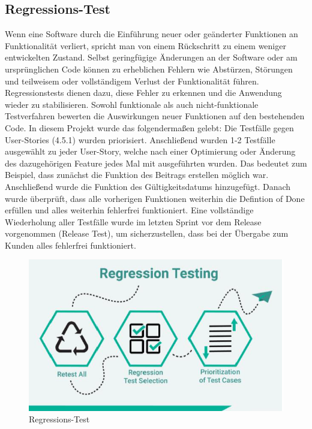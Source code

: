 \subsection{Regressions-Test}
\label{sub:UmsetzungTestRegression}

Wenn eine Software durch die Einführung neuer oder geänderter Funktionen an Funktionalität verliert, spricht man von einem Rückschritt zu einem weniger entwickelten Zustand. Selbst geringfügige Änderungen an der Software oder am ursprünglichen Code können zu erheblichen Fehlern wie Abstürzen, Störungen und teilweisem oder vollständigem Verlust der Funktionalität führen.
Regressionstests dienen dazu, diese Fehler zu erkennen und die Anwendung wieder zu stabilisieren. Sowohl funktionale als auch nicht-funktionale Testverfahren bewerten die Auswirkungen neuer Funktionen auf den bestehenden Code.
In diesem Projekt wurde das folgendermaßen gelebt: Die Testfälle gegen User-Stories (4.5.1) wurden priorisiert. Anschließend wurden 1-2 Testfälle ausgewählt zu jeder User-Story, welche nach einer Optimierung oder Änderung des dazugehörigen Feature jedes Mal mit ausgeführten wurden. Das bedeutet zum Beispiel, dass zunächst die Funktion des Beitrags erstellen möglich war. Anschließend wurde die Funktion des Gültigkeitsdatums hinzugefügt. Danach wurde überprüft, dass alle vorherigen Funktionen weiterhin die Defintion of Done erfüllen und alles weiterhin fehlerfrei funktioniert.
Eine vollständige Wiederholung aller Testfälle wurde im letzten Sprint vor dem Release vorgenommen (Release Test), um sicherzustellen, dass bei der Übergabe zum Kunden alles fehlerfrei funktioniert.

\begin{figure}[!htb]
    \centering
    \includegraphics[width=.8\textwidth]{figures/rebecca/Regressions_Test.png}
    \caption[]{Regressions-Test}
    \label{fig:Regressionstest}
\end{figure}

